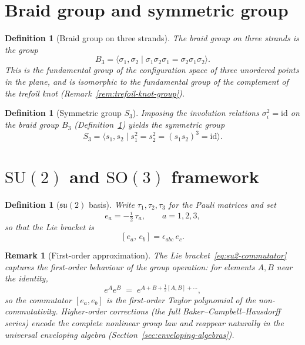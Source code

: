 \documentclass[12pt,a4paper]{report}
\newtheorem{definition}[theorem]{Definition}
\newtheorem{remark}[theorem]{Remark}
\begin{document}
\section{Braid group and symmetric group}
\label{sec:braid-symmetric}

\begin{definition}[Braid group on three strands]
\label{def:braid-group}
The \emph{braid group on three strands} is the group
\begin{equation}\label{eq:braid-presentation}
  B_3
  =\bigl\langle\sigma_1,\sigma_2
    \;\big|\;\sigma_1\sigma_2\sigma_1=\sigma_2\sigma_1\sigma_2\bigr\rangle.
\end{equation}
This is the fundamental group of the configuration space of three
unordered points in the plane, and is isomorphic to the fundamental group
of the complement of the trefoil knot
(Remark~\ref{rem:trefoil-knot-group}).
\end{definition}

\begin{definition}[Symmetric group $S_3$]
\label{def:s3-group}
Imposing the involution relations $\sigma_i^2=\mathrm{id}$ on the braid
group $B_3$ (Definition~\ref{def:braid-group}) yields the
\emph{symmetric group}
\begin{equation}\label{eq:s3-presentation}
  S_3
  =\bigl\langle s_1,s_2
    \;\big|\;s_1^2=s_2^2=(s_1 s_2)^3=\mathrm{id}\bigr\rangle.
\end{equation}
\end{definition}



\section{$\mathrm{SU}(2)$ and $\mathrm{SO}(3)$ framework}
\label{sec:su2-so3}

\begin{definition}[$\mathfrak{su}(2)$ basis]
\label{def:su2-basis}
Write $\tau_1,\tau_2,\tau_3$ for the Pauli matrices and set
\begin{equation}\label{eq:su2-basis}
  e_a=-\tfrac{i}{2}\,\tau_a,\qquad a=1,2,3,
\end{equation}
so that the Lie bracket is
\begin{equation}\label{eq:su2-commutator}
  [e_a,\,e_b]=\epsilon_{abc}\,e_c.
\end{equation}
\end{definition}

\begin{remark}[First-order approximation]
\label{rem:first-order-taylor}
The Lie bracket~\eqref{eq:su2-commutator} captures the first-order
behaviour of the group operation: for elements $A,B$ near the identity,
\[
  e^A e^B \;=\; e^{A+B+\tfrac{1}{2}[A,B]+\cdots},
\]
so the commutator $[e_a,e_b]$ is the first-order Taylor polynomial of
the non-commutativity.  Higher-order corrections (the full
Baker--Campbell--Hausdorff series) encode the complete nonlinear group
law and reappear naturally in the universal enveloping algebra
(Section~\ref{sec:enveloping-algebras}).
\end{remark}
\end{document}
